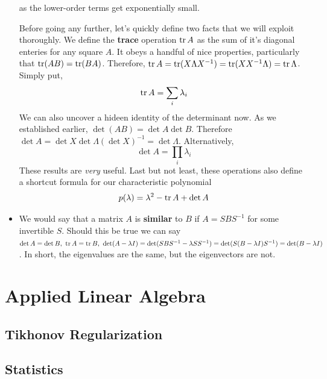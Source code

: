 \documentclass[11pt]{article}
\begin{document}
\begin{itemize}
	as the lower-order terms get exponentially small.
	\\
	\begin{ideabox}
	    Before going any further, let's quickly define two facts that we will exploit thoroughly. We define the \textbf{trace} operation $\trace A$ as the sum of it's diagonal enteries for any square $A$. It obeys a handful of nice properties, particularly that $\trace (AB) = \trace (BA)$. Therefore, $\trace A = \trace (X \Lambda X^{-1}) = \trace ( X X^{-1} \Lambda) = \trace \Lambda$. Simply put,
		$$\trace A = \sum_i \lambda_i$$
		We can also uncover a hideen identity of the determinant now. As we established earlier, $\det (AB) = \det A \det B$. Therefore $\det A = \det X \det \Lambda (\det X)^{-1} = \det \Lambda$. Alternatively,
		$$\det A = \prod_i \lambda_i$$
		These results are \textit{very} useful. Last but not least, these operations also define a shortcut formula for our characteristic polynomial $$p(\lambda) = \lambda^{2} - \trace A + \det A$$
	\end{ideabox}

\item We would say that a matrix $A$ is \textbf{similar} to $B$ if $A = SBS^{-1}$ for some invertible $S$. Should this be true we can say $\det A = \det B,\ \trace A = \trace B,\ \det (A - \lambda I) = \det (SBS^{-1} - \lambda SS^{-1}) = \det (S (B- \lambda I)S^{-1}) = \det(B- \lambda I)$. In short, the eigenvalues are the same, but the eigenvectors are not.

\end{itemize}

\section{Applied Linear Algebra}
\subsection{Tikhonov Regularization}
\subsection{Statistics}
\end{document}
